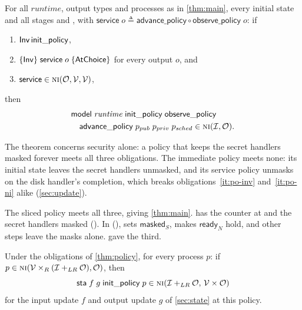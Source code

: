 \begin{theorem}\label{thm:policy}
For all $\mathit{runtime}$, output types and processes as in \cref{thm:main}, every
initial state  and all stages  and
, with
$\mathsf{service}\;o \triangleq \mathsf{advance\_policy} \circ \mathsf{observe\_policy}\;o$: if
\begin{enumerate}
\item\label{it:po-init} $\mathsf{Inv}\,\mathsf{init\_policy}$,
\item\label{it:po-inv} $\{\mathsf{Inv}\}\;\mathsf{service}\;o\;\{\mathsf{AtChoice}\}$ for every output $o$, and
\item\label{it:po-ni} $\mathsf{service} \in \text{\normalfont\scshape ni}(\mathcal{O},\mathcal{V},\mathcal{V})$,
\end{enumerate}
then
\begin{align*}
&\mathsf{model}\;\mathit{runtime}\;\mathsf{init\_policy}\;\mathsf{observe\_policy}\\
&\quad \mathsf{advance\_policy}\;p_{pub}\;p_{priv}\;p_{sched} \in \text{\normalfont\scshape ni}(\mathcal{I},\mathcal{O}).
\end{align*}
\end{theorem}

The theorem concerns security alone: a policy that keeps the secret handlers masked
forever meets all three obligations. The immediate policy meets none: its initial
state leaves the secret handlers unmasked, and its service policy unmasks on the disk
handler's completion, which breaks obligations~\ref{it:po-inv} and~\ref{it:po-ni}
alike (\cref{sec:update}).

The sliced policy meets all three, giving \cref{thm:main}.  has the
counter at  and the secret handlers masked (). In
 (),  sets
$\mathsf{masked}_S$,  makes $\mathsf{ready}_N$ hold, and other
steps leave the masks alone.  gave the third.

\begin{lemma}\label{lem:state-cell}
Under the obligations of \cref{thm:policy}, for every process $p$: if
$p \in \text{\normalfont\scshape ni}(\mathcal{V} \times_R (\mathcal{I} +_{LR} \mathcal{O}),\mathcal{O})$, then
\[
\mathsf{sta}\;f\;g\;\mathsf{init\_policy}\;p
  \in \text{\normalfont\scshape ni}(\mathcal{I} +_{LR} \mathcal{O},\, \mathcal{V} \times \mathcal{O})
\]
for the input update $f$ and output update $g$ of \cref{sec:state} at this policy.
\end{lemma}

